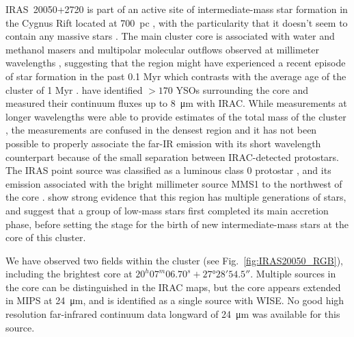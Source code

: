 IRAS~20050+2720 is part of an active site of intermediate-mass star formation in the Cygnus Rift located at 700~pc \citep{Wilking:1989el}, with the particularity that it doesn't seem to contain any massive stars \citep{Gunther:2012dq}. The main cluster core is associated with water and methanol masers \citep{Palla:1991up,Fontani:2010cf} and multipolar molecular outflows observed at millimeter wavelengths \citep{Bachiller:1995cy,Anglada:1998uu,Beltran:2008gu}, suggesting that the region might have experienced a recent episode of star formation in the past 0.1 Myr which contrasts with the average age of the cluster of 1 Myr \citep{Chen:1997tb,Gutermuth:2005hx}. \cite{Gutermuth:2009gca} have identified $>170$ YSOs surrounding the core and measured their continuum fluxes up to \SI{8}{\micro\meter} with IRAC. While measurements at longer wavelengths were able to provide estimates of the total mass of the cluster \citep[e.g. using IRAS,][\SI{388}{\Lsun}]{Molinari:1996td}, the measurements are confused in the densest region and it has not been possible to properly associate the far-IR emission with its short wavelength counterpart because of the small separation between IRAC-detected protostars. The IRAS point source was classified as a luminous class 0 protostar \citep{Bachiller:1996ja}, and its emission associated with the bright millimeter source MMS1 to the northwest of the core \citep{Chini:2001fa}. \cite{Beltran:2008gu} show strong evidence that this region has multiple generations of stars, and suggest that a group of low-mass stars first completed its main accretion phase, before setting the stage for the birth of new intermediate-mass stars at the core of this cluster.

We have observed two fields within the cluster (see Fig.~\ref{fig:IRAS20050_RGB}), including the brightest core at $20^h 07^m 06.70^s +\ang{27;28;54.5}$. Multiple sources in the core can be distinguished in the IRAC maps, but the core appears extended in \Spitzer MIPS at \SI{24}{\micro\meter}, and is identified as a single source with WISE. No good high resolution far-infrared continuum data longward of \SI{24}{\micro\meter} was available for this source.

